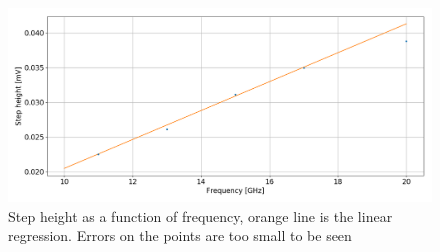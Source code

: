 \documentclass[a4paper,10pt]{article}
\begin{document}
\begin{figure}[H]
\centering
\includegraphics[width = \textwidth]{eh}
\caption{Step height as a function of frequency, orange line is the linear regression. Errors on the points are too small to be seen}\label{eh}
\end{figure}
\end{document}
